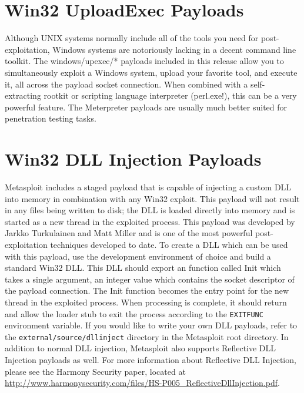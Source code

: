 \documentclass{report}
\begin{document}
\section{Win32 UploadExec Payloads}

\par
Although UNIX systems normally include all of the tools you need for
post-exploitation, Windows systems are notoriously lacking in a decent command
line toolkit. The windows/upexec/* payloads included in this release allow you
to simultaneously exploit a Windows system, upload your favorite tool, and
execute it, all across the payload socket connection. When combined with a
self-extracting rootkit or scripting language interpreter (perl.exe!), this can
be a very powerful feature. The Meterpreter payloads are usually much better
suited for penetration testing tasks.

\section{Win32 DLL Injection Payloads}

\par
Metasploit includes a staged payload that is capable of injecting a custom
DLL into memory in combination with any Win32 exploit. This payload will not
result in any files being written to disk; the DLL is loaded directly into
memory and is started as a new thread in the exploited process. This payload was
developed by Jarkko Turkulainen and Matt Miller and is one of the most powerful
post-exploitation techniques developed to date. To create a DLL which can be
used with this payload, use the development environment of choice and build a
standard Win32 DLL. This DLL should export an function called Init which takes a
single argument, an integer value which contains the socket descriptor of the
payload connection. The Init function becomes the entry point for the new thread
in the exploited process. When processing is complete, it should return and
allow the loader stub to exit the process according to the \texttt{EXITFUNC}
environment variable. If you would like to write your own DLL payloads, refer to
the \texttt{external/source/dllinject} directory in the Metasploit root
directory. In addition to normal DLL injection, Metasploit also supports
Reflective DLL Injection payloads as well. For more information about Reflective
DLL Injection, please see the Harmony Security paper, located at
\url{http://www.harmonysecurity.com/files/HS-P005\_ReflectiveDllInjection.pdf}.
\end{document}
